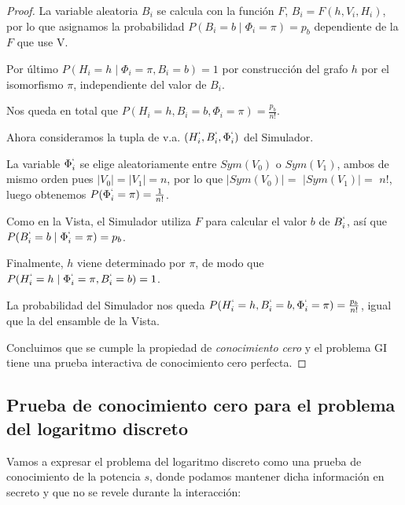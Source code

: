 \begin{proof}
	La variable aleatoria $B_i$ se calcula con la función $F$, $B_i=F(h, V_i, H_i)$, por lo que asignamos la probabilidad $P(B_i = b \mid \Phi_i = \pi) = p_b$ dependiente de la $F$ que use V.

	Por último $P(H_i = h \mid \Phi_i = \pi, B_i=b) = 1$ por construcción del grafo $h$ por el isomorfismo $\pi$, independiente del valor de $B_i$.
	
	Nos queda en total que $P(H_i=h, B_i=b, \Phi_i = \pi) = \frac{p_b}{n!}$.
	
	\hfil
	
	Ahora consideramos la tupla de v.a.  $(H_i^`, B_i^`, \Phi_i^`)$ del Simulador.
	
	La variable $\Phi_i^`$ se elige aleatoriamente entre $Sym(V_0)$ o $Sym(V_1)$, ambos de mismo orden pues $\mid V_0 \mid = \mid V_1 \mid = n$, por lo que  $\mid Sym(V_0) \mid =$ $ \mid Sym(V_1) \mid =$ $ n!$, luego obtenemos $P(\Phi_i^` = \pi)=\frac{1}{n!}$.
	
	Como en la Vista, el Simulador utiliza $F$ para calcular el valor $b$ de $B_i^`$, así que $P(B_i^` = b \mid \Phi_i^` = \pi) = p_b$.
	
	Finalmente, $h$ viene determinado por $\pi$, de modo que $P(H_i^` = h \mid \Phi_i^` = \pi, B_i^`=b) = 1$.
	
	La probabilidad del Simulador nos queda $P(H_i^`=h, B_i^`=b, \Phi_i^` = \pi) = \frac{p_b}{n!}$, igual que la del ensamble de la Vista.
	
	\hfil
	
	
	Concluimos que se cumple la propiedad de \textit{conocimiento cero} y el problema GI tiene una prueba interactiva de conocimiento cero perfecta.
	
	
\end{proof}







\subsection{Prueba de conocimiento cero para el problema del logaritmo discreto}\label{perfectDL}


Vamos a expresar el problema del logaritmo discreto como una prueba de conocimiento de la potencia $s$, donde podamos mantener dicha información en secreto y que no se revele durante la interacción:

\hfil

